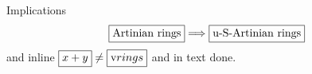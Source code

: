 \documentclass{article}
\begin{document}
Implications
$${\boxed{\mbox{Artinian rings}}}\Longrightarrow {\boxed{$u$\mbox{-}$S$\mbox{-Artinian rings}}}$$
and inline $\boxed{x+y}\ne\boxed{$v$ rings}$ and in text  done.
\end{document}
